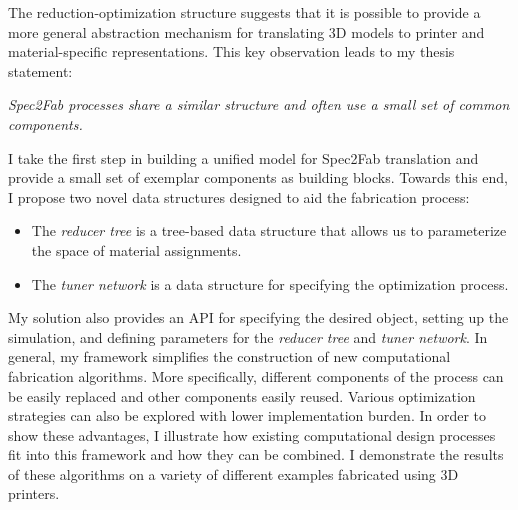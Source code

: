 The reduction-optimization structure suggests that it is possible to provide
a more general abstraction mechanism for translating 3D models to printer and material-specific representations.
This key observation leads to my thesis statement:

\emph{Spec2Fab processes share a similar structure and often use a small set of common components.}

I take the first step in building a unified model for Spec2Fab translation
and provide a small set of exemplar components as building blocks.
Towards this end, I propose two novel data structures designed to aid the fabrication process:
\begin{itemize}
\item The \emph{reducer tree} is a tree-based data structure that allows us to parameterize the space of material assignments.
\item The \emph{tuner network} is a data structure for specifying the optimization process.
\end{itemize}
My solution also provides an API for specifying the desired object, setting up the simulation, and defining parameters for the \emph{reducer tree} and \emph{tuner network}.
In general, my framework simplifies the construction of new computational fabrication algorithms.
More specifically, different components of the process can be easily replaced and other components easily reused. 
Various optimization strategies can also be explored with lower implementation burden. In order to show these advantages,
I illustrate how existing computational design processes fit into this framework and how they can be combined.
I demonstrate the results of these algorithms on a variety of different examples fabricated using 3D printers.
